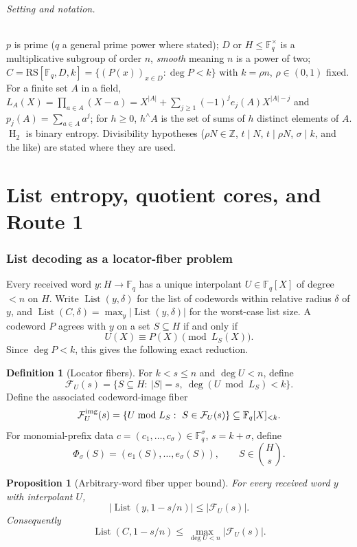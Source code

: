 \documentclass[11pt]{article}
\newtheorem{proposition}[proposition]{Proposition}
\theoremstyle{definition}
\newtheorem{definition}[definition]{Definition}
\newcommand{\F}{\mathbb F}
\newcommand{\Z}{\mathbb Z}
\newcommand{\HH}{\operatorname{H}_2}
\newcommand{\RS}{\mathrm{RS}}
\newcommand{\Lst}{\operatorname{List}}
\newcommand{\Fib}{\mathcal F}
\newcommand{\ImgFib}{\mathcal F^{\rm img}}
\newcommand{\List}{\operatorname{List}}
\begin{document}
\paragraph{Setting and notation.}
$p$ is prime ($q$ a general prime power where stated); $D$ or $H\le\F_q^\times$ is a multiplicative subgroup of order $n$, \emph{smooth} meaning $n$ is a power of two; $C=\RS[\F_q,D,k]=\{(P(x))_{x\in D}:\deg P<k\}$ with $k=\rho n$, $\rho\in(0,1)$ fixed.  For a finite set $A$ in a field, $L_A(X)=\prod_{a\in A}(X-a)=X^{|A|}+\sum_{j\ge1}(-1)^je_j(A)X^{|A|-j}$ and $p_j(A)=\sum_{a\in A}a^j$; for $h\ge0$, $h^{\wedge}A$ is the set of sums of $h$ distinct elements of $A$.  $\HH$ is binary entropy.  Divisibility hypotheses ($\rho N\in\Z$, $t\mid N$, $t\mid\rho N$, $\sigma\mid k$, and the like) are stated where they are used.

\part{List entropy, quotient cores, and Route 1}

\section{List decoding as a locator-fiber problem}\label{sec:fiber}

Every received word $y:H\to\F_q$ has a unique interpolant $U\in\F_q[X]$ of degree $<n$ on $H$.  Write $\List(y,\delta)$ for the list of codewords within relative radius $\delta$ of $y$, and $\Lst(C,\delta)=\max_y|\List(y,\delta)|$ for the worst-case list size.  A codeword $P$ agrees with $y$ on a set $S\subseteq H$ if and only if
\[
        U(X)\equiv P(X)\pmod{L_S(X)}.
\]
Since $\deg P<k$, this gives the following exact reduction.

\begin{definition}[Locator fibers]\label{def:locator-fiber}
For $k<s\le n$ and $\deg U<n$, define
\[
        \Fib_U(s)=\{S\subseteq H:\ |S|=s,\ \deg(U\bmod L_S)<k\}.
\]
Define the associated codeword-image fiber
\[
        \ImgFib_U(s)=\{U\bmod L_S:\ S\in\Fib_U(s)\}\subseteq \F_q[X]_{<k}.
\]
For monomial-prefix data $c=(c_1,\ldots,c_\sigma)\in\F_q^\sigma$, $s=k+\sigma$, define
\[
        \Phi_\sigma(S)=(e_1(S),\ldots,e_\sigma(S)),
        \qquad S\in\binom Hs .
\]
\end{definition}

\begin{proposition}[Arbitrary-word fiber upper bound]\label{prop:arb-fiber}
For every received word $y$ with interpolant $U$,
\[
        |\List(y,1-s/n)|\le |\Fib_U(s)|.
\]
Consequently
\[
        \Lst(C,1-s/n)\le \max_{\deg U<n}|\Fib_U(s)|.
\]
\end{proposition}
\end{document}
